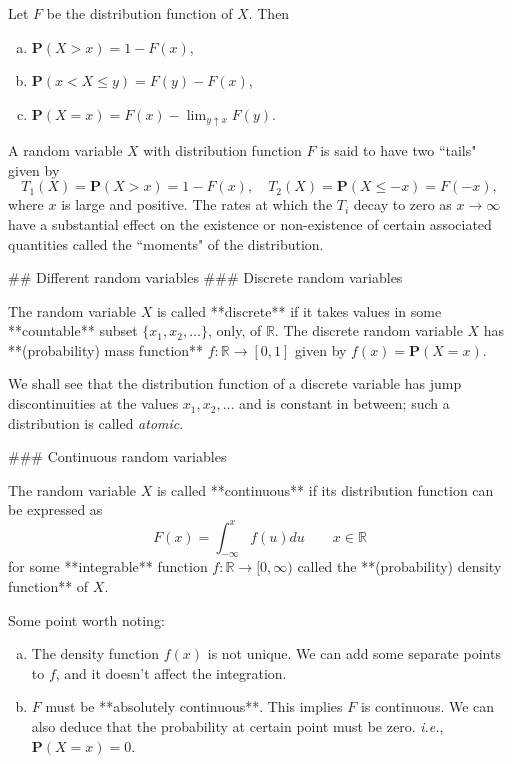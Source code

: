\begin{lemma}
Let $F$ be the distribution function of $X$. Then
\begin{enumerate}[(a)]
    \item $\mathbf{P}(X>x) = 1-F(x)$, 
    \item $\mathbf{P}(x < X \leq y) = F(y) - F(x)$,
    \item $\mathbf{P}(X = x) = F(x) - \lim_{y \uparrow x} F(y)$.
\end{enumerate}
\end{lemma}

A random variable $X$ with distribution function $F$ is said to have two ``tails" given by 
\begin{equation*}
    T_1 (X) = \mathbf{P}(X > x) = 1 - F(x), \quad T_2(X) = \mathbf{P}(X \leq -x) = F(-x),    
\end{equation*}
where $x$ is large and positive. The rates at which the $T_i$ decay to zero as $x\to\infty$ have a substantial effect on the existence or non-existence of certain associated quantities called the ``moments" of the distribution. 


## Different random variables
### Discrete random variables
\begin{definition}
The random variable $X$ is called **discrete** if it takes values in some **countable** subset $\{ x_1, x_2, \dots \}$, only, of $\mathbb{R}$. The discrete random variable $X$ has **(probability) mass function** $f : \mathbb{R} \to [0, 1]$ given by $f(x) = \mathbf{P}(X = x)$. 
\end{definition}
We shall see that the distribution function of a discrete variable has jump discontinuities 
at the values $x_1 , x_2, \dots$ and is constant in between; such a distribution is called \emph{atomic}.

### Continuous random variables
\begin{definition}
The random variable $X$ is called **continuous** if its distribution function can 
be expressed as 
\begin{equation*}
    F(x) = \int_{-\infty}^x f(u) du \qquad x \in \mathbb{R}
\end{equation*}
for some **integrable** function $f : \mathbb{R} \to [0, \infty)$ called the **(probability) density function** of $X$. 
\end{definition}
Some point worth noting:
\begin{enumerate}[(a)]
    \item The density function $f(x)$ is not unique. We can add some separate points to $f$, and it doesn't affect the integration.
    \item $F$ must be **absolutely continuous**. This implies $F$ is continuous. We can also deduce that the probability at certain point must be zero. \emph{i.e.}, $\mathbf{P}(X=x) = 0$.
\end{enumerate}

